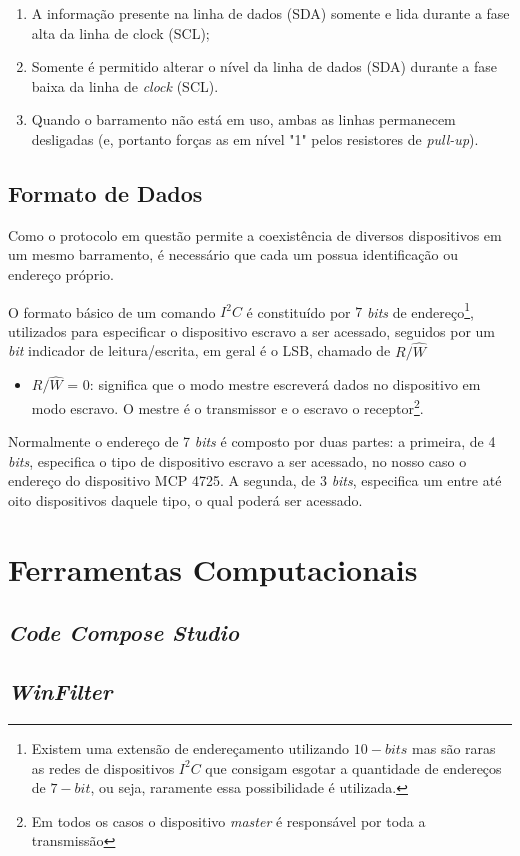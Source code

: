 	\begin{enumerate}
		\item A informação presente na linha de dados (SDA) somente 
		e lida durante a fase alta da linha de clock (SCL);
		\item Somente é permitido alterar o nível da linha de dados (SDA) durante a fase baixa da linha de \textit{clock} (SCL).
		\item Quando o barramento não está em uso, ambas as linhas permanecem desligadas (e, portanto forças as em nível "1" pelos resistores de \textit{pull-up}).
	\end{enumerate}

	\subsection{Formato de Dados}
	
		Como o protocolo em questão permite a coexistência de diversos dispositivos em um mesmo barramento, é necessário que cada um possua identificação ou endereço próprio.
		
		O formato básico de um comando $I^2C$ é constituído por $ 7 $ \textit{bits} de endereço\footnote{Existem uma extensão de endereçamento utilizando $10-bits$ mas são raras as redes de dispositivos $ I^2C $ que consigam esgotar a quantidade de endereços de $ 7-bit $, ou seja, raramente essa possibilidade é utilizada.}, utilizados para especificar o dispositivo escravo a ser acessado, seguidos por um \textit{bit} indicador de leitura/escrita, em geral é o LSB, chamado de $R/\hat{W}$
		
		\begin{itemize}
			\item $ R/\hat{W} $ = 0: significa que o modo mestre escreverá dados no dispositivo em modo escravo. O mestre é o transmissor e o escravo o receptor\footnote{Em todos os casos o dispositivo \textit{master} é responsável por toda a transmissão}. 
		\end{itemize}
		
		Normalmente o endereço de 7 \textit{bits} é composto por duas partes: a primeira, de 4 \textit{bits}, especifica o tipo de dispositivo escravo a ser acessado, no nosso caso o endereço do dispositivo MCP 4725. A segunda, de 3 \textit{bits}, especifica um entre até oito dispositivos daquele tipo, o qual poderá ser acessado.
		
		
	
	
	
\section{Ferramentas Computacionais}

	\subsection{\textit{Code Compose Studio}}
	
	\subsection{\textit{WinFilter}}
